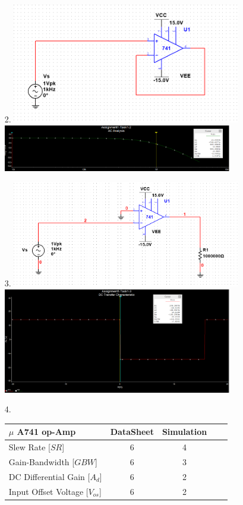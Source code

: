 \documentclass[11pt,a4paper]{article}
\begin{document}
\begin{enumerate}
  \item[2.]
  		\includegraphics[width=10cm]{Task1-2-Circuit}\\
		\includegraphics[width=10cm]{Task1-2-ACAnalysis}
  \item[3.]
    	\includegraphics[width=10cm]{Task1-3-Circuit}\\
		\includegraphics[width=10cm]{Task1-3-DCAnalysis}
  \item[4.]
  
	\begin{tabular}{l*{3}{c}r}
	$\mu$ A741 op-Amp              & DataSheet & Simulation  \\
	\hline
	Slew Rate [$SR$]   & 6 & 4 \\
	Gain-Bandwidth [$GBW$]              & 6 & 3 \\
	DC Differential Gain [$A_{d}$]             & 6 & 2 \\
	Input Offset Voltage [$V_{os}$]           & 6 & 2 \\
	\end{tabular}

\end{enumerate}
\end{document}
